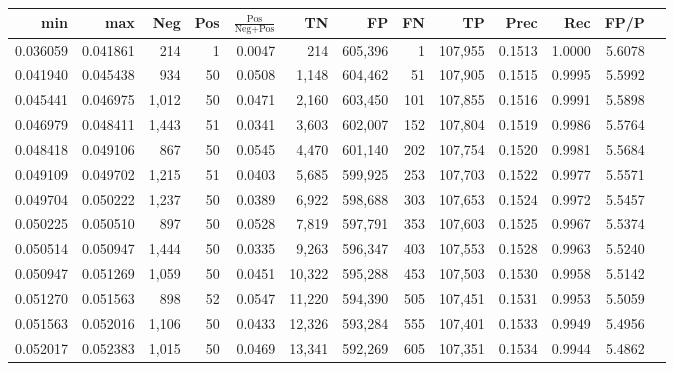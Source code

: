 \begin{tabular}{rrrrrrrrrrrrr}
\toprule
     min &      max &   Neg & Pos & $\frac{\text{Pos}}{\text{Neg}+\text{Pos}}$ &      TN &      FP &      FN &      TP &   Prec &    Rec &   FP/P \\
\midrule
0.036059 & 0.041861 &   214 &   1 &                                     0.0047 &     214 & 605,396 &       1 & 107,955 & 0.1513 & 1.0000 & 5.6078 \\
0.041940 & 0.045438 &   934 &  50 &                                     0.0508 &   1,148 & 604,462 &      51 & 107,905 & 0.1515 & 0.9995 & 5.5992 \\
0.045441 & 0.046975 & 1,012 &  50 &                                     0.0471 &   2,160 & 603,450 &     101 & 107,855 & 0.1516 & 0.9991 & 5.5898 \\
0.046979 & 0.048411 & 1,443 &  51 &                                     0.0341 &   3,603 & 602,007 &     152 & 107,804 & 0.1519 & 0.9986 & 5.5764 \\
0.048418 & 0.049106 &   867 &  50 &                                     0.0545 &   4,470 & 601,140 &     202 & 107,754 & 0.1520 & 0.9981 & 5.5684 \\
0.049109 & 0.049702 & 1,215 &  51 &                                     0.0403 &   5,685 & 599,925 &     253 & 107,703 & 0.1522 & 0.9977 & 5.5571 \\
0.049704 & 0.050222 & 1,237 &  50 &                                     0.0389 &   6,922 & 598,688 &     303 & 107,653 & 0.1524 & 0.9972 & 5.5457 \\
0.050225 & 0.050510 &   897 &  50 &                                     0.0528 &   7,819 & 597,791 &     353 & 107,603 & 0.1525 & 0.9967 & 5.5374 \\
0.050514 & 0.050947 & 1,444 &  50 &                                     0.0335 &   9,263 & 596,347 &     403 & 107,553 & 0.1528 & 0.9963 & 5.5240 \\
0.050947 & 0.051269 & 1,059 &  50 &                                     0.0451 &  10,322 & 595,288 &     453 & 107,503 & 0.1530 & 0.9958 & 5.5142 \\
0.051270 & 0.051563 &   898 &  52 &                                     0.0547 &  11,220 & 594,390 &     505 & 107,451 & 0.1531 & 0.9953 & 5.5059 \\
0.051563 & 0.052016 & 1,106 &  50 &                                     0.0433 &  12,326 & 593,284 &     555 & 107,401 & 0.1533 & 0.9949 & 5.4956 \\
0.052017 & 0.052383 & 1,015 &  50 &                                     0.0469 &  13,341 & 592,269 &     605 & 107,351 & 0.1534 & 0.9944 & 5.4862 \\

\end{tabular}
